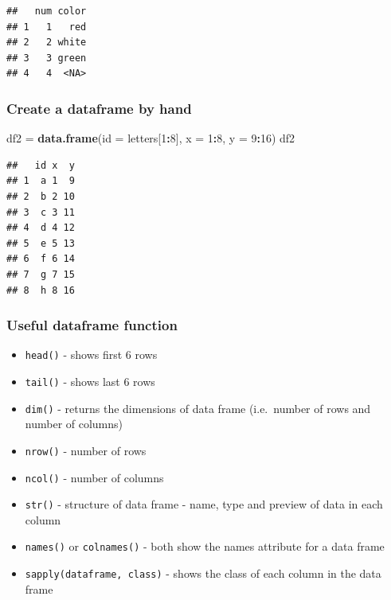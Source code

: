 \documentclass[
]{article}
\newenvironment{Shaded}{\begin{snugshade}}{\end{snugshade}}
\newcommand{\DataTypeTok}[1]{\textcolor[rgb]{0.13,0.29,0.53}{#1}}
\newcommand{\DecValTok}[1]{\textcolor[rgb]{0.00,0.00,0.81}{#1}}
\newcommand{\KeywordTok}[1]{\textcolor[rgb]{0.13,0.29,0.53}{\textbf{#1}}}
\newcommand{\NormalTok}[1]{#1}
\newcommand{\OperatorTok}[1]{\textcolor[rgb]{0.81,0.36,0.00}{\textbf{#1}}}
\newcommand{\StringTok}[1]{\textcolor[rgb]{0.31,0.60,0.02}{#1}}
\providecommand{\tightlist}{%
  \setlength{\itemsep}{0pt}\setlength{\parskip}{0pt}}
\begin{document}
\begin{verbatim}
##   num color
## 1   1   red
## 2   2 white
## 3   3 green
## 4   4  <NA>
\end{verbatim}

\hypertarget{create-a-dataframe-by-hand}{%
\subsubsection{\texorpdfstring{\textbf{Create a dataframe by
hand}}{Create a dataframe by hand}}\label{create-a-dataframe-by-hand}}

\begin{Shaded}
\begin{Highlighting}[]
\NormalTok{df2 =}\StringTok{ }\KeywordTok{data.frame}\NormalTok{(}\DataTypeTok{id =}\NormalTok{ letters[}\DecValTok{1}\OperatorTok{:}\DecValTok{8}\NormalTok{], }\DataTypeTok{x =} \DecValTok{1}\OperatorTok{:}\DecValTok{8}\NormalTok{, }\DataTypeTok{y =} \DecValTok{9}\OperatorTok{:}\DecValTok{16}\NormalTok{)}
\NormalTok{df2}
\end{Highlighting}
\end{Shaded}

\begin{verbatim}
##   id x  y
## 1  a 1  9
## 2  b 2 10
## 3  c 3 11
## 4  d 4 12
## 5  e 5 13
## 6  f 6 14
## 7  g 7 15
## 8  h 8 16
\end{verbatim}

\hypertarget{useful-dataframe-function}{%
\subsubsection{\texorpdfstring{\textbf{Useful dataframe
function}}{Useful dataframe function}}\label{useful-dataframe-function}}

\begin{itemize}
\tightlist
\item
  \texttt{head()} - shows first 6 rows
\item
  \texttt{tail()} - shows last 6 rows
\item
  \texttt{dim()} - returns the dimensions of data frame (i.e.~number of
  rows and number of columns)
\item
  \texttt{nrow()} - number of rows
\item
  \texttt{ncol()} - number of columns
\item
  \texttt{str()} - structure of data frame - name, type and preview of
  data in each column
\item
  \texttt{names()} or \texttt{colnames()} - both show the names
  attribute for a data frame
\item
  \texttt{sapply(dataframe,\ class)} - shows the class of each column in
  the data frame
\end{itemize}
\end{document}
